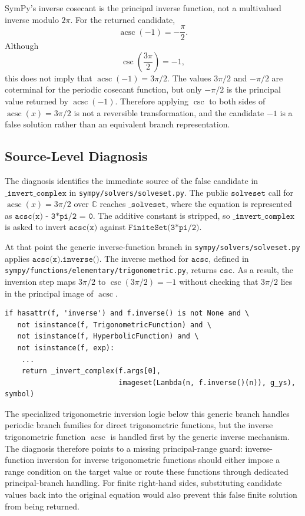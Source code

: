 \documentclass[11pt]{article}
\begin{document}
SymPy's inverse cosecant is the principal inverse function, not a multivalued inverse modulo \(2\pi\). For the returned candidate,
\[
  \operatorname{acsc}(-1) = -\frac{\pi}{2}.
\]
Although
\[
  \csc\!\left(\frac{3\pi}{2}\right) = -1,
\]
this does not imply that \(\operatorname{acsc}(-1)=3\pi/2\). The values \(3\pi/2\) and \(-\pi/2\) are coterminal for the periodic cosecant function, but only \(-\pi/2\) is the principal value returned by \(\operatorname{acsc}(-1)\). Therefore applying \(\csc\) to both sides of \(\operatorname{acsc}(x)=3\pi/2\) is not a reversible transformation, and the candidate \(-1\) is a false solution rather than an equivalent branch representation.

\subsection{Source-Level Diagnosis}

The diagnosis identifies the immediate source of the false candidate in \(\texttt{\_invert\_complex}\) in \nolinkurl{sympy/solvers/solveset.py}. The public \(\texttt{solveset}\) call for \(\operatorname{acsc}(x)=3\pi/2\) over \(\mathbb{C}\) reaches \(\texttt{\_solveset}\), where the equation is represented as \(\texttt{acsc(x) - 3*pi/2 = 0}\). The additive constant is stripped, so \(\texttt{\_invert\_complex}\) is asked to invert \(\texttt{acsc(x)}\) against \(\texttt{FiniteSet(3*pi/2)}\).

At that point the generic inverse-function branch in \nolinkurl{sympy/solvers/solveset.py} applies \(\texttt{acsc(x).inverse()}\). The inverse method for \(\texttt{acsc}\), defined in \nolinkurl{sympy/functions/elementary/trigonometric.py}, returns \(\texttt{csc}\). As a result, the inversion step maps \(3\pi/2\) to \(\csc(3\pi/2)=-1\) without checking that \(3\pi/2\) lies in the principal image of \(\operatorname{acsc}\).

\begin{lstlisting}[style=bugpython]
if hasattr(f, 'inverse') and f.inverse() is not None and \
   not isinstance(f, TrigonometricFunction) and \
   not isinstance(f, HyperbolicFunction) and \
   not isinstance(f, exp):
    ...
    return _invert_complex(f.args[0],
                           imageset(Lambda(n, f.inverse()(n)), g_ys), symbol)
\end{lstlisting}

The specialized trigonometric inversion logic below this generic branch handles periodic branch families for direct trigonometric functions, but the inverse trigonometric function \(\operatorname{acsc}\) is handled first by the generic inverse mechanism. The diagnosis therefore points to a missing principal-range guard: inverse-function inversion for inverse trigonometric functions should either impose a range condition on the target value or route these functions through dedicated principal-branch handling. For finite right-hand sides, substituting candidate values back into the original equation would also prevent this false finite solution from being returned.
\end{document}
